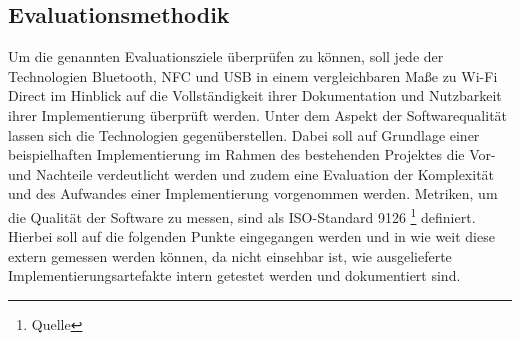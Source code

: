     \subsection{Evaluationsmethodik}
    	Um die genannten Evaluationsziele überprüfen zu können, soll jede der Technologien Bluetooth, NFC und USB in einem vergleichbaren Maße zu Wi-Fi Direct im Hinblick auf die Vollständigkeit ihrer Dokumentation und Nutzbarkeit ihrer Implementierung überprüft werden.
    	Unter dem Aspekt der Softwarequalität lassen sich die Technologien gegenüberstellen. Dabei soll auf Grundlage einer beispielhaften Implementierung im Rahmen des bestehenden Projektes die Vor- und Nachteile verdeutlicht werden und zudem eine Evaluation der Komplexität und des Aufwandes einer Implementierung vorgenommen werden. Metriken, um die Qualität der Software zu messen, sind als ISO-Standard 9126 \footnote{Quelle} definiert. Hierbei soll auf die folgenden Punkte eingegangen werden und in wie weit diese extern gemessen werden können, da nicht einsehbar ist, wie ausgelieferte Implementierungsartefakte intern getestet werden und dokumentiert sind.

